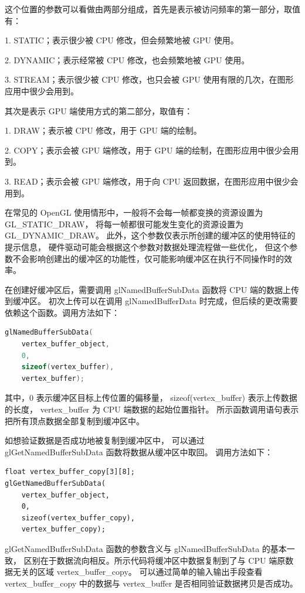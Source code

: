 \documentclass[fontset=windows]{ctexart}
\begin{document}
这个位置的参数可以看做由两部分组成，首先是表示被访问频率的第一部分，取值有：

1. STATIC；表示很少被 CPU 修改，但会频繁地被 GPU 使用。

2. DYNAMIC；表示经常被 CPU 修改，也会频繁地被 GPU 使用。

3. STREAM；表示很少被 CPU 修改，也只会被 GPU 使用有限的几次，在图形应用中很少会用到。

其次是表示 GPU 端使用方式的第二部分，取值有：

1. DRAW；表示被 CPU 修改，用于 GPU 端的绘制。

2. COPY；表示会被 GPU 端修改，用于 GPU 端的绘制，在图形应用中很少会用到。

3. READ；表示会被 GPU 端修改，用于向 CPU 返回数据，在图形应用中很少会用到。

在常见的 OpenGL 使用情形中，一般将不会每一帧都变换的资源设置为 GL\_STATIC\_DRAW，
将每一帧都很可能发生变化的资源设置为 GL\_DYNAMIC\_DRAW。
此外，这个参数仅表示所创建的缓冲区的使用特征的提示信息，
硬件驱动可能会根据这个参数对数据处理流程做一些优化，
但这个参数不会影响创建出的缓冲区的功能性，仅可能影响缓冲区在执行不同操作时的效率。

在创建好缓冲区后，需要调用 glNamedBufferSubData 函数将 CPU 端的数据上传到缓冲区。
初次上传可以在调用 glNamedBufferData 时完成，但后续的更改需要依赖这个函数。调用方法如下：

\begin{lstlisting}[language=c++]
glNamedBufferSubData(
    vertex_buffer_object,
    0,
    sizeof(vertex_buffer),
    vertex_buffer);
\end{lstlisting}

其中，0 表示缓冲区目标上传位置的偏移量，
sizeof(vertex\_buffer) 表示上传数据的长度，
vertex\_buffer 为 CPU 端数据的起始位置指针。
所示函数调用语句表示把所有顶点数据全部复制到缓冲区中。

如想验证数据是否成功地被复制到缓冲区中，
可以通过 glGetNamedBufferSubData 函数将数据从缓冲区中取回。
调用方法如下：

\begin{lstlisting}
float vertex_buffer_copy[3][8];
glGetNamedBufferSubData(
    vertex_buffer_object,
    0,
    sizeof(vertex_buffer_copy),
    vertex_buffer_copy);
\end{lstlisting}

glGetNamedBufferSubData 函数的参数含义与 glNamedBufferSubData 的基本一致，
区别在于数据流向相反。所示代码将缓冲区中数据复制到了与 CPU 端原数据无关的区域
vertex\_buffer\_copy。
可以通过简单的输入输出手段查看 vertex\_buffer\_copy 中的数据与 vertex\_buffer
是否相同验证数据拷贝是否成功。
\end{document}
